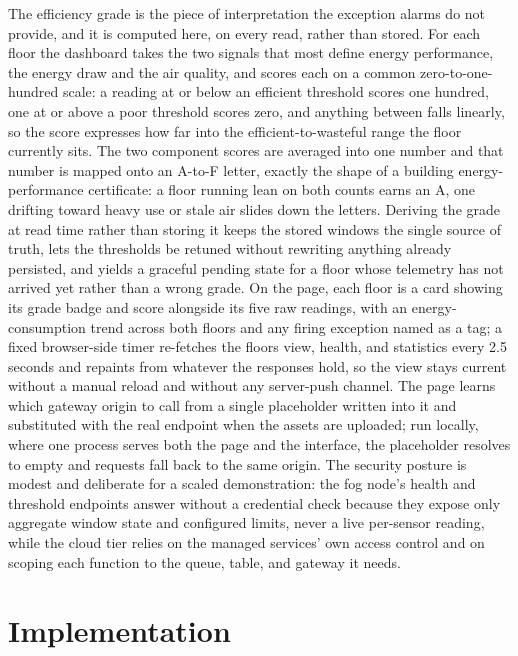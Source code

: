 \documentclass[conference]{IEEEtran}
\begin{document}
The efficiency grade is the piece of interpretation the exception alarms do not provide, and it is computed here, on every read, rather than stored. For each floor the dashboard takes the two signals that most define energy performance, the energy draw and the air quality, and scores each on a common zero-to-one-hundred scale: a reading at or below an efficient threshold scores one hundred, one at or above a poor threshold scores zero, and anything between falls linearly, so the score expresses how far into the efficient-to-wasteful range the floor currently sits. The two component scores are averaged into one number and that number is mapped onto an A-to-F letter, exactly the shape of a building energy-performance certificate: a floor running lean on both counts earns an A, one drifting toward heavy use or stale air slides down the letters. Deriving the grade at read time rather than storing it keeps the stored windows the single source of truth, lets the thresholds be retuned without rewriting anything already persisted, and yields a graceful pending state for a floor whose telemetry has not arrived yet rather than a wrong grade. On the page, each floor is a card showing its grade badge and score alongside its five raw readings, with an energy-consumption trend across both floors and any firing exception named as a tag; a fixed browser-side timer re-fetches the floors view, health, and statistics every 2.5 seconds and repaints from whatever the responses hold, so the view stays current without a manual reload and without any server-push channel. The page learns which gateway origin to call from a single placeholder written into it and substituted with the real endpoint when the assets are uploaded; run locally, where one process serves both the page and the interface, the placeholder resolves to empty and requests fall back to the same origin. The security posture is modest and deliberate for a scaled demonstration: the fog node's health and threshold endpoints answer without a credential check because they expose only aggregate window state and configured limits, never a live per-sensor reading, while the cloud tier relies on the managed services' own access control and on scoping each function to the queue, table, and gateway it needs.

\section{Implementation}
\end{document}
